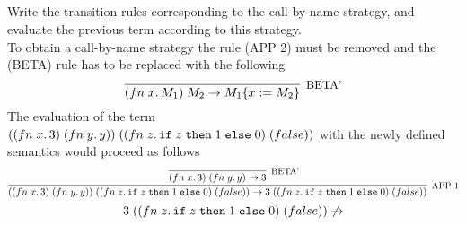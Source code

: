 \subsection{}

Write the transition rules corresponding to the call-by-name strategy, and
evaluate the previous term according to this strategy.\\

To obtain a call-by-name strategy the rule (APP 2) must be removed and the
(BETA) rule has to be replaced with the following
\[
	\infer[\text{\small{BETA'}}]
	{
		\APP{(\FN{x}{M_1})}{M_2} \to M_1\SUBST{x}{M_2}
	}
	{}
\]
The evaluation of the term
$((fn\;x.\,3)\;(fn\;y.\,y))\;((fn\;z.\,\texttt{if}\;z\;\texttt{then}\;1\;\texttt{else}\;0)\;(false))$
with the newly defined semantics would proceed as follows
\[
	\infer[\text{\small{APP 1}}]
	{
		\APP{(\APP{(\FN{x}{3})}{(\FN{y}{y})})}{(\APP{(\FN{z}{\IF{z}{1}{0}})}{(false)})} \to
		\APP{3}{(\APP{(\FN{z}{\IF{z}{1}{0}})}{(false)})}
	}
	{
		\infer[\text{\small{BETA'}}]
		{
			\APP{(\FN{x}{3})}{(\FN{y}{y})} \to 3
		}
		{}
	}
\]
\[
	3\;((fn\;z.\,\texttt{if}\;z\;\texttt{then}\;1\;\texttt{else}\;0)\;(false)) \not\to
\]
